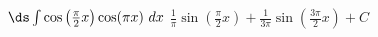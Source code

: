 {$\ds \int \cos\left(\frac{\pi}{2} x\right)\cos(\pi x)\ dx$}
{$\frac{1}{\pi}\sin(\frac{\pi}{2} x)+\frac{1}{3\pi}\sin(\frac{3\pi}{2} x)+ C$}
